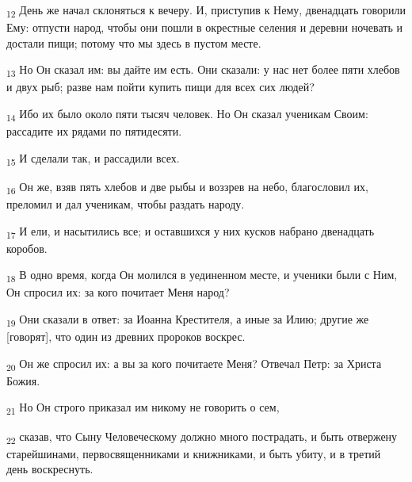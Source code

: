 \begin{tcolorbox}
\textsubscript{12} День же начал склоняться к вечеру. И, приступив к Нему, двенадцать говорили Ему: отпусти народ, чтобы они пошли в окрестные селения и деревни ночевать и достали пищи; потому что мы здесь в пустом месте.
\end{tcolorbox}
\begin{tcolorbox}
\textsubscript{13} Но Он сказал им: вы дайте им есть. Они сказали: у нас нет более пяти хлебов и двух рыб; разве нам пойти купить пищи для всех сих людей?
\end{tcolorbox}
\begin{tcolorbox}
\textsubscript{14} Ибо их было около пяти тысяч человек. Но Он сказал ученикам Своим: рассадите их рядами по пятидесяти.
\end{tcolorbox}
\begin{tcolorbox}
\textsubscript{15} И сделали так, и рассадили всех.
\end{tcolorbox}
\begin{tcolorbox}
\textsubscript{16} Он же, взяв пять хлебов и две рыбы и воззрев на небо, благословил их, преломил и дал ученикам, чтобы раздать народу.
\end{tcolorbox}
\begin{tcolorbox}
\textsubscript{17} И ели, и насытились все; и оставшихся у них кусков набрано двенадцать коробов.
\end{tcolorbox}
\begin{tcolorbox}
\textsubscript{18} В одно время, когда Он молился в уединенном месте, и ученики были с Ним, Он спросил их: за кого почитает Меня народ?
\end{tcolorbox}
\begin{tcolorbox}
\textsubscript{19} Они сказали в ответ: за Иоанна Крестителя, а иные за Илию; другие же [говорят], что один из древних пророков воскрес.
\end{tcolorbox}
\begin{tcolorbox}
\textsubscript{20} Он же спросил их: а вы за кого почитаете Меня? Отвечал Петр: за Христа Божия.
\end{tcolorbox}
\begin{tcolorbox}
\textsubscript{21} Но Он строго приказал им никому не говорить о сем,
\end{tcolorbox}
\begin{tcolorbox}
\textsubscript{22} сказав, что Сыну Человеческому должно много пострадать, и быть отвержену старейшинами, первосвященниками и книжниками, и быть убиту, и в третий день воскреснуть.
\end{tcolorbox}
